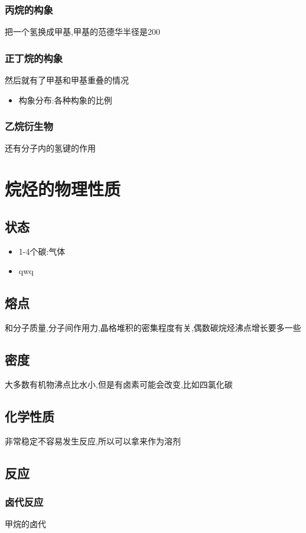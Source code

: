 \documentclass[11pt]{article}
\begin{document}
\subsubsection{丙烷的构象}
\label{sec:orge364b25}
把一个氢换成甲基,甲基的范德华半径是200
\subsubsection{正丁烷的构象}
\label{sec:org818feb8}
然后就有了甲基和甲基重叠的情况
\begin{itemize}
\item 构象分布:各种构象的比例
\end{itemize}
\subsubsection{乙烷衍生物}
\label{sec:orgd543f6d}
还有分子内的氢键的作用
\section{烷烃的物理性质}
\label{sec:org6836ce6}
\subsection{状态}
\label{sec:orgd20070f}
\begin{itemize}
\item 1-4个碳:气体
\item qwq
\end{itemize}
\subsection{熔点}
\label{sec:orgb665b4f}
和分子质量,分子间作用力,晶格堆积的密集程度有关,偶数碳烷烃沸点增长要多一些
\subsection{密度}
\label{sec:orgffd545e}
大多数有机物沸点比水小,但是有卤素可能会改变,比如四氯化碳
\subsection{化学性质}
\label{sec:org968d657}
非常稳定不容易发生反应,所以可以拿来作为溶剂
\subsection{反应}
\label{sec:orgead90fb}
\subsubsection{卤代反应}
\label{sec:org242588c}
甲烷的卤代
\end{document}
